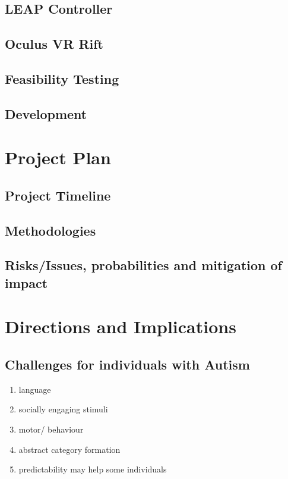 \documentclass[10pt]{article}
\begin{document}
\subsection{LEAP Controller}
\subsection{Oculus VR Rift}

\subsection{Feasibility Testing}

\subsection{Development}

\section{Project Plan}\label{plan}
\subsection{Project Timeline}
\subsection{Methodologies}

\subsection{Risks/Issues, probabilities and mitigation of impact}


\section{Directions and Implications}\label{future}
\subsection{Challenges for individuals with Autism}

\begin{enumerate}
\item language
\item socially engaging stimuli
\item motor/ behaviour
\item abstract category formation
\item predictability may help some individuals

\end{enumerate}
\end{document}

